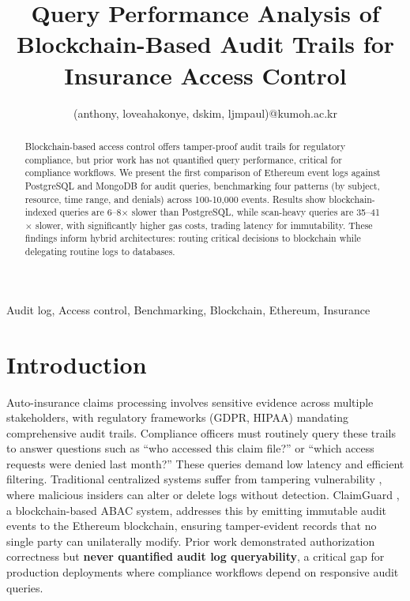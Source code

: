\documentclass[conference]{IEEEtran}
\begin{document}
\title{Query Performance Analysis of Blockchain-Based Audit Trails for Insurance Access Control}

\author{
	{(anthony, loveahakonye, dskim, ljmpaul)}@kumoh.ac.kr}
\maketitle


\begin{abstract}
	Blockchain-based access control offers tamper-proof audit trails for regulatory compliance, but prior work has not quantified query performance, critical for compliance workflows. We present the first comparison of Ethereum event logs against PostgreSQL and MongoDB for audit queries, benchmarking four patterns (by subject, resource, time range, and denials) across 100-10,000 events. Results show blockchain-indexed queries are 6--8$\times$ slower than PostgreSQL, while scan-heavy queries are 35--41$\times$ slower, with significantly higher gas costs, trading latency for immutability. These findings inform hybrid architectures: routing critical decisions to blockchain while delegating routine logs to databases.
\end{abstract}


\begin{IEEEkeywords}
Audit log, Access control, Benchmarking, Blockchain, Ethereum, Insurance
\end{IEEEkeywords}


\section{Introduction}
Auto-insurance claims processing involves sensitive evidence across multiple stakeholders, with regulatory frameworks (GDPR, HIPAA) mandating comprehensive audit trails. Compliance officers must routinely query these trails to answer questions such as ``who accessed this claim file?'' or ``which access requests were denied last month?'' These queries demand low latency and efficient filtering. Traditional centralized systems suffer from tampering vulnerability \cite{centralized_iam}, where malicious insiders can alter or delete logs without detection. ClaimGuard \cite{claimguard_conf}, a blockchain-based ABAC system, addresses this by emitting immutable audit events to the Ethereum blockchain, ensuring tamper-evident records that no single party can unilaterally modify. Prior work demonstrated authorization correctness but \textbf{never quantified audit log queryability}, a critical gap for production deployments where compliance workflows depend on responsive audit queries.
\end{document}
